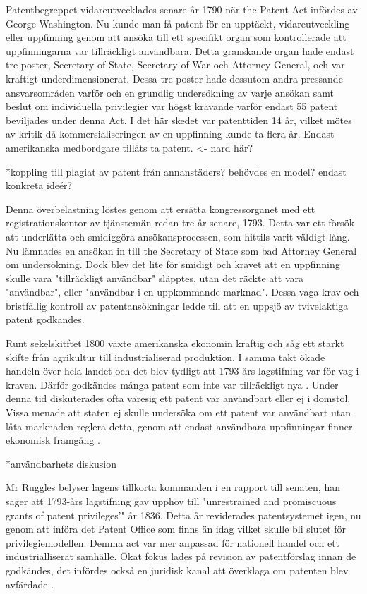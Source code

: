 Patentbegreppet vidareutvecklades senare år 1790 när the Patent Act infördes av George Washington. Nu
kunde man få patent för en upptäckt, vidareutveckling eller uppfinning genom att ansöka till ett
specifikt organ som kontrollerade att uppfinningarna var tillräckligt användbara\cite{nard}. Detta
granskande organ hade endast tre poster, Secretary of State, Secretary of War och Attorney General, och
var kraftigt underdimensionerat. Dessa tre poster hade dessutom andra pressande ansvarsområden varför
och en grundlig undersökning av varje ansökan samt beslut om individuella privilegier var högst krävande varför endast 55 patent beviljades under denna Act\cite{nard}.  I det här skedet var patenttiden 14 år, vilket
mötes av kritik då kommersialiseringen av en uppfinning kunde ta flera år. Endast amerikanska
medbordgare tilläts ta patent\cite{nard}. <- nard här? 

*koppling till plagiat av patent från annanstäders? behövdes en model? endast konkreta ideér?

Denna överbelastning löstes genom att ersätta kongressorganet med ett registrationskontor
av tjänstemän redan tre år senare, 1793. Detta var ett försök att underlätta och smidiggöra
ansökansprocessen, som hittils varit väldigt lång. Nu lämnades en ansökan in till the Secretary of State
som bad Attorney General om undersökning. Dock blev det lite för smidigt och kravet att en uppfinning
skulle vara "tillräckligt användbar" släpptes, utan det räckte att vara "användbar", eller "användbar i
en uppkommande marknad". Dessa vaga krav och bristfällig kontroll av patentansökningar ledde till att en
uppsjö av tvivelaktiga patent godkändes\cite{nard}. 

Runt sekelskitftet 1800 växte amerikanska ekonomin kraftig och såg ett starkt skifte från agrikultur
till industrialiserad produktion. I samma takt ökade handeln över hela landet och det blev tydligt att 1793-års lagstifning var för vag i kraven. Därför godkändes många patent som inte var tillräckligt nya \cite{nard}. Under denna tid diskuterades ofta varesig ett patent var användbart eller ej i domstol. Vissa menade att staten ej skulle undersöka om ett patent var användbart utan låta marknaden reglera detta, genom att endast användbara uppfinningar finner ekonomisk framgång \cite{bracha}.

*användbarhets diskusion

Mr Ruggles belyser lagens tillkorta kommanden i en rapport till senaten, han säger att 1793-års lagstifning gav upphov till "unrestrained and promiscuous grants of patent privileges’" \cite{ruggles} år 1836. 
Detta år reviderades patentsystemet igen, nu genom att införa det Patent
Office som finns än idag\cite{nard} vilket skulle bli slutet för privilegiemodellen\cite{bracha}. Dennna act var mer anpassad för nationell handel och ett industrialliserat samhälle. Ökat fokus lades på revision av patentförslag innan
de godkändes, det infördes också en juridisk kanal att överklaga om patenten blev avfärdade \cite{nard}.

